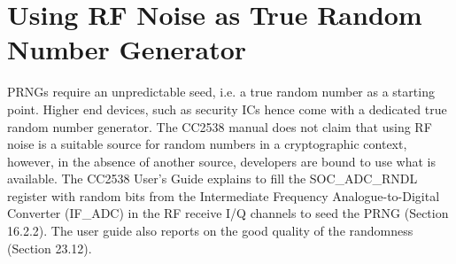 \section{Using RF Noise as True Random Number Generator} \label{Seed}

PRNGs require an unpredictable seed, i.e. a true random number as a starting point. Higher end devices, such as security ICs hence come with a dedicated true random number generator. The CC2538 manual does not claim that using RF noise is a suitable source for random numbers in a cryptographic context, however, in the absence of another source, developers are bound to use what is available. The CC2538 User's Guide\cite{CC2538Manual} explains to fill the SOC\_ADC\_RNDL register with random bits from the Intermediate Frequency Analogue-to-Digital Converter (IF\_ADC) in the RF receive I/Q channels to seed the PRNG (Section 16.2.2). The user guide\cite{CC2538Manual} also reports on the good quality of the randomness (Section 23.12). 






